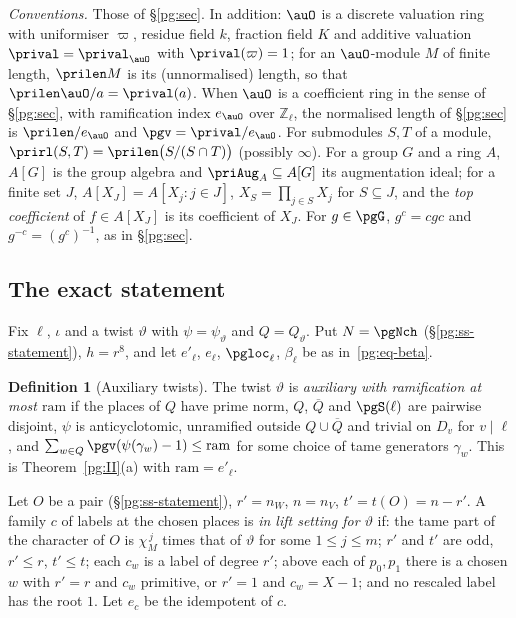 \documentclass[10pt]{amsart}
\theoremstyle{definition}
\newtheorem{definition}[theorem]{Definition}
\theoremstyle{remark}
\newcommand{\Z}{\mathbb Z}
\begin{document}
\emph{Conventions.} Those of \S\ref{pg:sec}. In addition: $\auO$ is a discrete valuation ring with
uniformiser $\varpi$, residue field $k$, fraction field $K$ and additive valuation $\prival=
\prival_\auO$ with $\prival(\varpi)=1$; for an $\auO$-module $M$ of finite length, $\prilen M$ is
its (unnormalised) length, so that $\prilen\auO/a=\prival(a)$. When $\auO$ is a coefficient ring
in the sense of \S\ref{pg:sec}, with ramification index $e_\auO$ over $\Z_\ell$, the normalised
length of \S\ref{pg:sec} is $\prilen/e_\auO$ and $\pgv=\prival/e_\auO$. For submodules $S,T$ of a
module, $\prirl(S,T)=\prilen\bigl(S/(S\cap T)\bigr)$ (possibly $\infty$). For a group $G$ and a
ring $A$, $A[G]$ is the group algebra and $\priAug_A\subseteq A[G]$ its augmentation ideal; for a
finite set $J$, $A[X_J]=A[X_j:j\in J]$, $X_S=\prod_{j\in S}X_j$ for $S\subseteq J$, and the
\emph{top coefficient} of $f\in A[X_J]$ is its coefficient of $X_J$. For $g\in\pgG$,
$g^c=cgc$ and $g^{-c}=(g^c)^{-1}$, as in \S\ref{pg:sec}.

\subsection{The exact statement}\label{pri:ss-statement}

Fix $\ell$, $\iota$ and a twist $\vartheta$ with $\psi=\psi_\vartheta$ and $Q=Q_\vartheta$. Put
$N=\pgNch$ (\S\ref{pg:ss-statement}), $h=r^8$, and let $e'_\ell$, $e_\ell$, $\pgloc_\ell$,
$\beta_\ell$ be as in~\eqref{pg:eq-beta}.

\begin{definition}[Auxiliary twists]\label{pri:def-aux}
The twist $\vartheta$ is \emph{auxiliary with ramification at most $\mathrm{ram}$} if the places
of $Q$ have prime norm, $Q$, $\overline Q$ and $\pgS(\ell)$ are pairwise disjoint, $\psi$ is
anticyclotomic, unramified outside $Q\cup\overline Q$ and trivial on $D_v$ for $v\mid\ell$, and
$\sum_{w\in Q}\pgv(\psi(\gamma_w)-1)\le\mathrm{ram}$ for some choice of tame generators
$\gamma_w$. This is Theorem~\ref{pg:II}(a) with $\mathrm{ram}=e'_\ell$.
\end{definition}

Let $O$ be a pair (\S\ref{pg:ss-statement}), $r'=n_W$, $n=n_V$, $t'=t(O)=n-r'$. A family $c$ of
labels at the chosen places is \emph{in lift setting for $\vartheta$} if: the tame part of the
character of $O$ is $\chi_M^{\,j}$ times that of $\vartheta$ for some $1\le j\le m$; $r'$ and $t'$
are odd, $r'\le r$, $t'\le t$; each $c_w$ is a label of degree $r'$; above each of $p_0,p_1$ there
is a chosen $w$ with $r'=r$ and $c_w$ primitive, or $r'=1$ and $c_w=X-1$; and no rescaled label
has the root $1$. Let $e_c$ be the idempotent of $c$.
\end{document}
